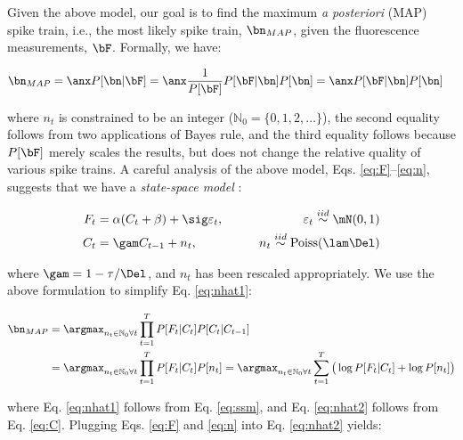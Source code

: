 Given the above model, our goal is to find the maximum \emph{a posteriori} (MAP) spike train, i.e., the most likely spike train, $\bn_{MAP}$,  given the fluorescence measurements, $\bF$. Formally, we have:

\begin{align}
\bn_{MAP} &=  \anx P[\bn | \bF] =  \anx \frac{1}{P[\bF]} P[\bF | \bn] P[\bn] =  \anx  P[\bF | \bn] P[\bn]   \label{eq:nhat1} %
\end{align}

\noindent where $n_t$ is constrained to be an integer ($\mathbb{N}_0=\{0,1,2,\ldots\}$), the second equality follows from two applications of Bayes rule, and the third equality follows because $P[\bF]$ merely scales the results, but does not change the relative quality of various spike trains.  A careful analysis of the above model, Eqs. \eqref{eq:F}--\eqref{eq:n}, suggests that we have a \emph{state-space model} \cite{DurbinKoopman01}:

\begin{subequations} \label{eq:ssm}
\begin{align} 
F_t &= \alpha (C_t + \beta) + \sig \varepsilon_t, \qquad& \varepsilon_t \overset{iid}{\sim} \mN(0,1) \\
C_t &= \gam C_{t-1} + n_t, & n_t \overset{iid}{\sim} \text{Poiss}(\lam \Del)
\end{align}
\end{subequations}

\noindent where $\gam = 1-\tau/\Del$, and $n_t$ has been rescaled appropriately.  We use the above formulation to simplify Eq. \eqref{eq:nhat1}:

\begin{subequations}  \label{eq:obj}
\begin{align}
\bn_{MAP}
&= \argmax_{n_t \in \mathbb{N}_0 \forall t} \prod_{t=1}^T  P[F_t | C_t]  P[C_t | C_{t-1}]  \label{eq:nhat2} \\
&= \argmax_{n_t \in \mathbb{N}_0 \forall t} \prod_{t=1}^T  P[F_t | C_t]  P[n_t] 
= \argmax_{n_t \in \mathbb{N}_0 \forall t} \sum_{t=1}^T \big( \log P[F_t | C_t] + \log P[n_t]\big)  \label{eq:nhat2} %
\end{align} 
\end{subequations}

\noindent where Eq. \eqref{eq:nhat1} follows from Eq. \eqref{eq:ssm}, and Eq. \eqref{eq:nhat2} follows from Eq. \eqref{eq:C}. Plugging Eqs. \eqref{eq:F} and \eqref{eq:n} into Eq. \eqref{eq:nhat2} yields:

